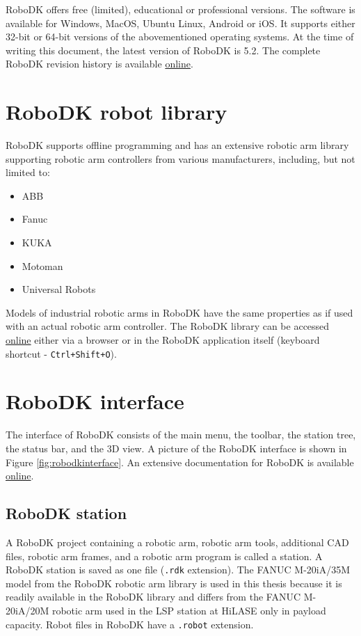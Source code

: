 RoboDK offers free (limited), educational or professional versions. 
The software is available for Windows, MacOS, Ubuntu Linux, Android or iOS. It supports either 32-bit or 64-bit versions of the abovementioned operating systems. At the time of writing this document, the latest version of RoboDK is 5.2. The complete RoboDK revision history is available \href{https://robodk.com/whatsnew}{online}. 

\section{RoboDK robot library}

RoboDK supports offline programming and has an extensive robotic arm library supporting robotic arm controllers from various manufacturers, including, but not limited to:

\begin{itemize}
    \item ABB 
    \item Fanuc 
    \item KUKA 
    \item Motoman 
    \item Universal Robots 
\end{itemize}
Models of industrial robotic arms in RoboDK have the same properties as if used with an actual robotic arm controller. The RoboDK library can be accessed \href{https://robodk.com/library}{online} either via a browser or in the RoboDK application itself (keyboard shortcut - \texttt{Ctrl+Shift+O}).


\section{RoboDK interface}

The interface of RoboDK consists of the main menu, the toolbar, the station tree, the status bar, and the 3D view. A picture of the RoboDK interface is shown in Figure \ref{fig:robodkinterface}. An extensive documentation for RoboDK is available \href{https://robodk.com/doc/en/Basic-Guide.html#Start}{online}.

\subsection{RoboDK station}

A RoboDK project containing a robotic arm, robotic arm tools, additional CAD files, robotic arm frames, and a robotic arm program is called a station. A RoboDK station is saved as one file (\texttt{.rdk} extension).  The FANUC M-20iA/35M model from the RoboDK robotic arm library is used in this thesis because it is readily available in the RoboDK library and differs from the FANUC M-20iA/20M robotic arm used in the LSP station at HiLASE only in payload capacity. Robot files in RoboDK have a \texttt{.robot} extension.

